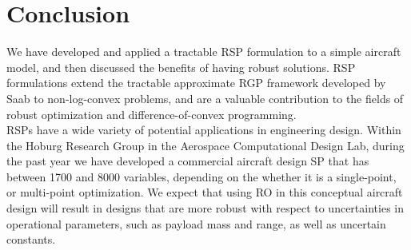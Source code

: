 \section{Conclusion}

We have developed and applied a tractable RSP formulation to a simple aircraft model, and then discussed the benefits of having robust solutions. RSP formulations extend the tractable approximate RGP framework developed by Saab to non-log-convex problems, and are a valuable contribution to the fields of robust optimization and difference-of-convex programming.\\

RSPs have a wide variety of potential applications in engineering design. Within the Hoburg Research Group in the Aerospace Computational Design Lab, during the past year we have developed a commercial aircraft design SP that has between 1700 and 8000 variables, depending on the whether it is a single-point, or multi-point optimization. We expect that using RO in this conceptual aircraft design will result in designs that are more robust with respect to uncertainties in operational parameters, such as payload mass and range, as well as uncertain constants.

